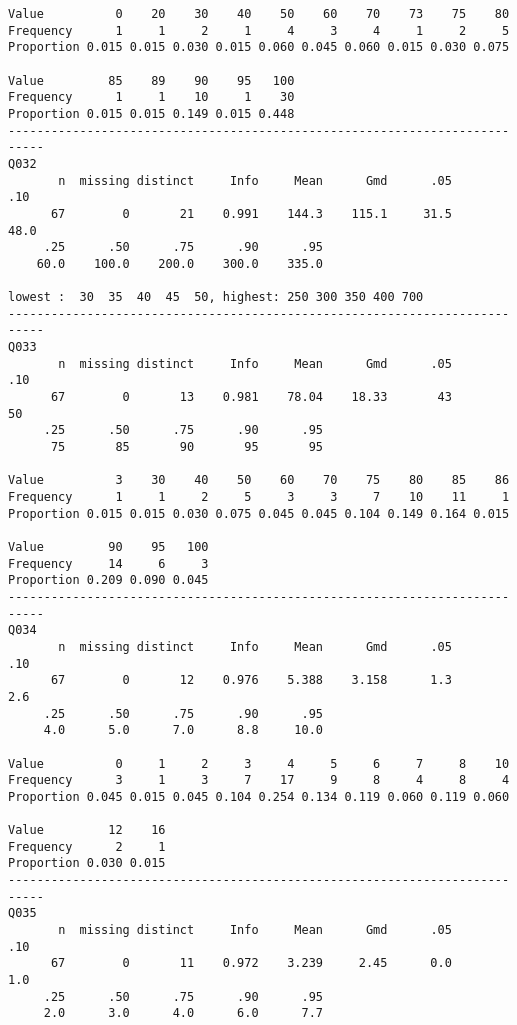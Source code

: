 \documentclass[]{article}
\begin{document}
\begin{verbatim}
Value          0    20    30    40    50    60    70    73    75    80
Frequency      1     1     2     1     4     3     4     1     2     5
Proportion 0.015 0.015 0.030 0.015 0.060 0.045 0.060 0.015 0.030 0.075
                                        
Value         85    89    90    95   100
Frequency      1     1    10     1    30
Proportion 0.015 0.015 0.149 0.015 0.448
---------------------------------------------------------------------------
Q032 
       n  missing distinct     Info     Mean      Gmd      .05      .10 
      67        0       21    0.991    144.3    115.1     31.5     48.0 
     .25      .50      .75      .90      .95 
    60.0    100.0    200.0    300.0    335.0 

lowest :  30  35  40  45  50, highest: 250 300 350 400 700
---------------------------------------------------------------------------
Q033 
       n  missing distinct     Info     Mean      Gmd      .05      .10 
      67        0       13    0.981    78.04    18.33       43       50 
     .25      .50      .75      .90      .95 
      75       85       90       95       95 
                                                                      
Value          3    30    40    50    60    70    75    80    85    86
Frequency      1     1     2     5     3     3     7    10    11     1
Proportion 0.015 0.015 0.030 0.075 0.045 0.045 0.104 0.149 0.164 0.015
                            
Value         90    95   100
Frequency     14     6     3
Proportion 0.209 0.090 0.045
---------------------------------------------------------------------------
Q034 
       n  missing distinct     Info     Mean      Gmd      .05      .10 
      67        0       12    0.976    5.388    3.158      1.3      2.6 
     .25      .50      .75      .90      .95 
     4.0      5.0      7.0      8.8     10.0 
                                                                      
Value          0     1     2     3     4     5     6     7     8    10
Frequency      3     1     3     7    17     9     8     4     8     4
Proportion 0.045 0.015 0.045 0.104 0.254 0.134 0.119 0.060 0.119 0.060
                      
Value         12    16
Frequency      2     1
Proportion 0.030 0.015
---------------------------------------------------------------------------
Q035 
       n  missing distinct     Info     Mean      Gmd      .05      .10 
      67        0       11    0.972    3.239     2.45      0.0      1.0 
     .25      .50      .75      .90      .95 
     2.0      3.0      4.0      6.0      7.7 
                                                                      

\end{verbatim}
\end{document}
